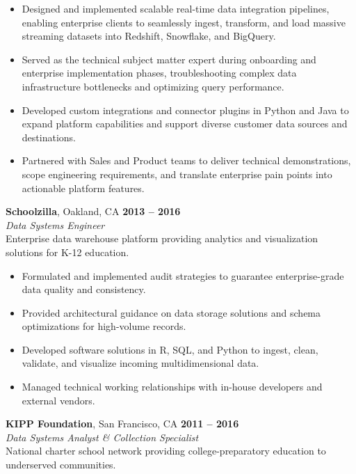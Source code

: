 \documentclass[10pt,letterpaper]{article}
\begin{document}
\begin{itemize}[leftmargin=1.2em, itemsep=1.5pt, topsep=2pt]
    \item Designed and implemented scalable real-time data integration pipelines, enabling enterprise clients to seamlessly ingest, transform, and load massive streaming datasets into Redshift, Snowflake, and BigQuery.
    \item Served as the technical subject matter expert during onboarding and enterprise implementation phases, troubleshooting complex data infrastructure bottlenecks and optimizing query performance.
    \item Developed custom integrations and connector plugins in Python and Java to expand platform capabilities and support diverse customer data sources and destinations.
    \item Partnered with Sales and Product teams to deliver technical demonstrations, scope engineering requirements, and translate enterprise pain points into actionable platform features.
\end{itemize}
\vspace{0.4em}
\noindent
\textbf{Schoolzilla}, Oakland, CA \hfill \textbf{2013 -- 2016}\\
\textit{Data Systems Engineer} \\
{\footnotesize \color{mutedtext} Enterprise data warehouse platform providing analytics and visualization solutions for K-12 education.}\\[0.2em]
\begin{itemize}[leftmargin=1.2em, itemsep=1.5pt, topsep=2pt]
    \item Formulated and implemented audit strategies to guarantee enterprise-grade data quality and consistency.
    \item Provided architectural guidance on data storage solutions and schema optimizations for high-volume records.
    \item Developed software solutions in R, SQL, and Python to ingest, clean, validate, and visualize incoming multidimensional data.
    \item Managed technical working relationships with in-house developers and external vendors.
\end{itemize}
\vspace{0.4em}
\noindent
\textbf{KIPP Foundation}, San Francisco, CA \hfill \textbf{2011 -- 2016}\\
\textit{Data Systems Analyst \& Collection Specialist} \\
{\footnotesize \color{mutedtext} National charter school network providing college-preparatory education to underserved communities.}\\[0.2em]
\end{document}
